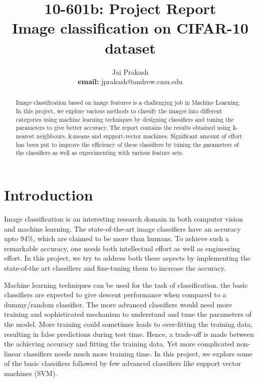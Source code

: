 \documentclass{article} %
\author{Jai Prakash \\ \textbf{email:} jprakash@andrew.cmu.edu}
\title{10-601b: Project Report\\Image classification on CIFAR-10 dataset
}
\begin{document}
\maketitle

\begin{abstract}
Image classification based on image features is a challenging job in Machine Learning. In this project, we explore various methods to classify the images into different categories using machine learning techniques by designing classifiers and tuning the parameters to give better accuracy. The report contains the results obtained using k-nearest neighbours, k-means and support-vector machines. Significant amount of effort has been put to improve the efficiency of these classifiers by tuning the parameters of the classifiers as well as experimenting with various feature sets. %
\end{abstract}

\section{Introduction}
Image classification is an interesting research domain in both computer vision and machine learning. The state-of-the-art image classifiers have an accuracy upto 94\%, which are claimed to be more than humans. To achieve such a remarkable accuracy, one needs both intellectual effort as well as engineering effort. In this project, we try to address both these aspects by implementing the state-of-the art classifiers and fine-tuning them to increase the accuracy.

Machine learning techniques can be used for the task of classification. the basic classifiers are expected to give descent performance when compared to a dummy/random classifier. The more advanced classifiers would need more training and sophisticated mechanism to understand and tune the parameters of the model. More training could sometimes leads to over-fitting the training data, resulting in false predictions during test time. Hence, a trade-off is made between the achieving accuracy and fitting the training data. Yet more complicated non-linear classifiers needs much more training time. In this project, we explore some of the basic classifiers followed by few advanced classifiers like support vector machines (SVM).
\end{document}

